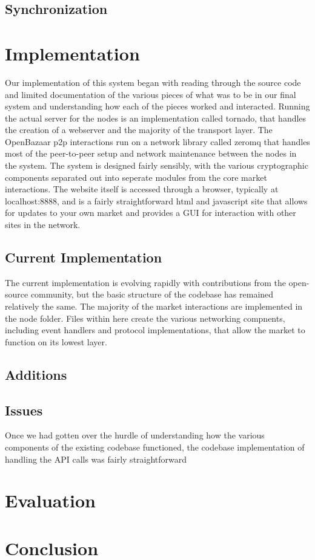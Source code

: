 \documentclass[12pt,twocolumn]{article}
\begin{document}
\subsection{Synchronization}



\section{Implementation}
Our implementation of this system began with reading through the source code and limited documentation of the various pieces of what was to be in our final system and understanding how each of the pieces worked and interacted. Running the actual server for the nodes is an implementation called tornado, that handles the creation of a webserver and the majority of the transport layer. The OpenBazaar p2p interactions run on a network library called zeromq that handles most of the peer-to-peer setup and network maintenance between the nodes in the system. The system is designed fairly sensibly, with the various cryptographic components separated out into seperate modules from the core market interactions. The website itself is accessed through a browser, typically at {{\sc localhost:8888}}, and is a fairly straightforward html and javascript site that allows for updates to your own market and provides a GUI for interaction with other sites in the network.

\subsection{Current Implementation}
The current implementation is evolving rapidly with contributions from the open-source community, but the basic structure of the codebase has remained relatively the same. The majority of the market interactions are implemented in the node folder. Files within here create the various networking compnents, including event handlers and protocol implementations, that allow the market to function on its lowest layer. 

\subsection{Additions}

\subsection{Issues}
Once we had gotten over the hurdle of understanding how the various components of the existing codebase functioned, the codebase implementation of handling the API calls was fairly straightforward



\section{Evaluation}




\section{Conclusion}
\end{document}

